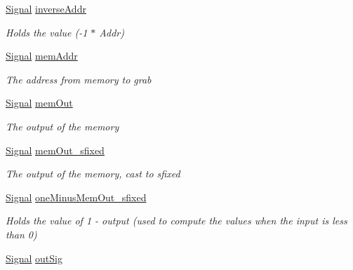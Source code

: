\begin{DoxyCompactItemize}
\hyperlink{class_n_n_gen_1_1_signal}{Signal} \hyperlink{class_n_n_gen_1_1_transfer_function_wrapper_acb5029596b5ce5da76a4fff79d6a10b0}{inverse\+Addr}
\begin{DoxyCompactList}\small\item\em Holds the value (-\/1 $\ast$ Addr) \end{DoxyCompactList}\item 
\hyperlink{class_n_n_gen_1_1_signal}{Signal} \hyperlink{class_n_n_gen_1_1_transfer_function_wrapper_a60c3f55dade25c86f36d0524bcaadf6e}{mem\+Addr}
\begin{DoxyCompactList}\small\item\em The address from memory to grab \end{DoxyCompactList}\item 
\hyperlink{class_n_n_gen_1_1_signal}{Signal} \hyperlink{class_n_n_gen_1_1_transfer_function_wrapper_a164219eb34ccaf82e0ee47ad3dcd3c25}{mem\+Out}
\begin{DoxyCompactList}\small\item\em The output of the memory \end{DoxyCompactList}\item 
\hyperlink{class_n_n_gen_1_1_signal}{Signal} \hyperlink{class_n_n_gen_1_1_transfer_function_wrapper_aec4c1de29fdd1ffae3ac087477973d48}{mem\+Out\+\_\+sfixed}
\begin{DoxyCompactList}\small\item\em The output of the memory, cast to sfixed \end{DoxyCompactList}\item 
\hyperlink{class_n_n_gen_1_1_signal}{Signal} \hyperlink{class_n_n_gen_1_1_transfer_function_wrapper_a28102412789e840a8d62d4f1d80b6fce}{one\+Minus\+Mem\+Out\+\_\+sfixed}
\begin{DoxyCompactList}\small\item\em Holds the value of 1 -\/ output (used to compute the values when the input is less than 0) \end{DoxyCompactList}\item 
\hyperlink{class_n_n_gen_1_1_signal}{Signal} \hyperlink{class_n_n_gen_1_1_transfer_function_wrapper_a5775b19c91e1a869c0c5e7587aaa4a00}{out\+Sig}

\end{DoxyCompactItemize}
